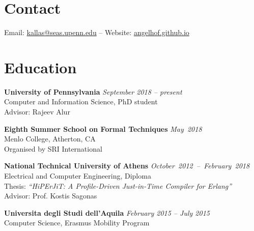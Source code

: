 \documentclass[margin]{res}
\begin{document}
\begin{resume}

\section{Contact} 
Email: \href{mailto:kallas@seas.upenn.edu}{kallas@seas.upenn.edu} -- Website: \href{https://angelhof.github.io/}{angelhof.github.io}


\section{Education}
\textbf{University of Pennsylvania} \hfill {\em September 2018 -- present}\\
Computer and Information Science, PhD student \\
Advisor: Rajeev Alur

\textbf{Eighth Summer School on Formal Techniques} \hfill \mbox{\em May 2018}\\
Menlo College, Atherton, CA \\
Organised by SRI International

\textbf{National Technical University of Athens} \hfill \mbox{\em October 2012 -- February 2018}\\
Electrical and Computer Engineering, Diploma \\ %
Thesis: \textit{``HiPErJiT: A Profile-Driven Just-in-Time Compiler for Erlang''} \\
Advisor: Prof. Kostis Sagonas 

\textbf{Universita degli Studi dell'Aquila} \hfill {\em February 2015 -- July 2015} \\
Computer Science, Erasmus Mobility Program %





\end{resume}
\end{document}

